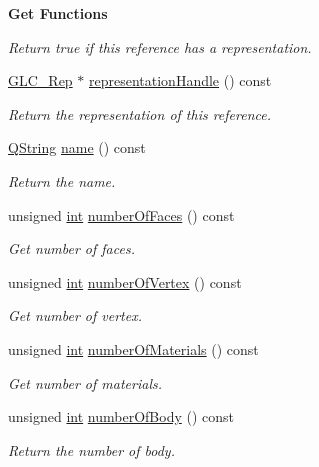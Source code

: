 \begin{Indent}{\bf Get Functions}
\begin{DoxyCompactItemize}
\begin{DoxyCompactList}\small\item\em Return true if this reference has a representation. \end{DoxyCompactList}\item 
\hyperlink{class_g_l_c___rep}{G\-L\-C\-\_\-\-Rep} $\ast$ \hyperlink{class_g_l_c___struct_reference_a96bcbbd5cf0faa5805570aaeb35cf89b}{representation\-Handle} () const 
\begin{DoxyCompactList}\small\item\em Return the representation of this reference. \end{DoxyCompactList}\item 
\hyperlink{group___u_a_v_objects_plugin_gab9d252f49c333c94a72f97ce3105a32d}{Q\-String} \hyperlink{class_g_l_c___struct_reference_a4e92220287fe68a1d09deea6378eb7f5}{name} () const 
\begin{DoxyCompactList}\small\item\em Return the name. \end{DoxyCompactList}\item 
unsigned \hyperlink{ioapi_8h_a787fa3cf048117ba7123753c1e74fcd6}{int} \hyperlink{class_g_l_c___struct_reference_aafb5856daf61f6cb3072d8b4ee83eec2}{number\-Of\-Faces} () const 
\begin{DoxyCompactList}\small\item\em Get number of faces. \end{DoxyCompactList}\item 
unsigned \hyperlink{ioapi_8h_a787fa3cf048117ba7123753c1e74fcd6}{int} \hyperlink{class_g_l_c___struct_reference_a7c9df470ec964fbc75d53c46b35f463d}{number\-Of\-Vertex} () const 
\begin{DoxyCompactList}\small\item\em Get number of vertex. \end{DoxyCompactList}\item 
unsigned \hyperlink{ioapi_8h_a787fa3cf048117ba7123753c1e74fcd6}{int} \hyperlink{class_g_l_c___struct_reference_a6660adc34356ff52c3fd89f1e8bf9547}{number\-Of\-Materials} () const 
\begin{DoxyCompactList}\small\item\em Get number of materials. \end{DoxyCompactList}\item 
unsigned \hyperlink{ioapi_8h_a787fa3cf048117ba7123753c1e74fcd6}{int} \hyperlink{class_g_l_c___struct_reference_aed400924bc69a90d5e45a8d47e16b65f}{number\-Of\-Body} () const 
\begin{DoxyCompactList}\small\item\em Return the number of body. \end{DoxyCompactList}\item 

\end{DoxyCompactItemize}
\end{Indent}

